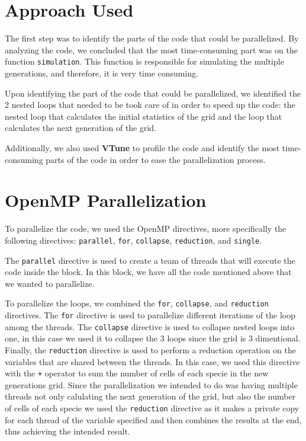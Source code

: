 \documentclass{article}
\begin{document}
\section{Approach Used}

The first step was to identify the parts of the code that 
could be parallelized. By analyzing the code, we concluded that 
the most time-consuming part was on the function \texttt{simulation}. 
This function is responsible for simulating the multiple generations, 
and therefore, it is very time consuming.

Upon identifying the part of the code that could be parallelized, 
we identified the 2 nested loops that needed to be took care of in 
order to speed up the code: the nested loop that calculates the initial statistics 
of the grid and the loop that calculates the next generation of the grid. 

Additionally, we also used \textbf{VTune} to profile the code and 
identify the most time-consuming parts of the code in order to ease 
the parallelization process.

\section{OpenMP Parallelization}
To parallelize the code, we used the OpenMP directives, more specifically  
the following directives: \texttt{parallel}, \texttt{for}, \texttt{collapse}, 
\texttt{reduction}, and \texttt{single}.

The \texttt{parallel} directive is used to create a team of threads 
that will execute the code inside the block. In this block, we have 
all the code mentioned above that we wanted to parallelize.

To parallelize the loops, we combined the \texttt{for}, \texttt{collapse}, 
and \texttt{reduction} directives. The \texttt{for} directive is used to parallelize
different iterations of the loop among the threads. The \texttt{collapse} directive is used to collapse 
nested loops into one, in this case we used it to collapse the 3 loops since the grid is 3 dimentional.
Finally, the \texttt{reduction} directive is used to perform a reduction 
operation on the variables that are shared between the threads. In this case, we 
used this directive with the \texttt{+} operator to sum the number of cells of each 
specie in the new generations grid. Since the parallelization we intended to do was having 
multiple threads not only calulating the next generation of the grid, but also the 
number of cells of each specie we used the \texttt{reduction} directive as it 
makes a private copy for each thread of the variable specified and then combines 
the results at the end, thus achieving the intended result. 
\end{document}
